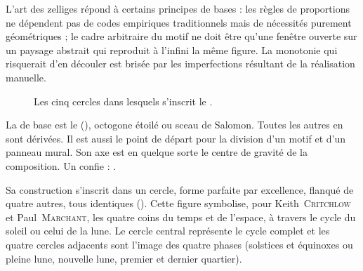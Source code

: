 L'art des zelliges répond à certains principes de bases : les règles 
de proportions ne dépendent pas de codes empiriques traditionnels mais 
de nécessités purement géométriques ; le cadre arbitraire du motif ne 
doit être qu'une fenêtre ouverte sur un paysage abstrait qui reproduit 
à l'infini la même figure. La monotonie qui risquerait d'en découler 
est brisée par les imperfections résultant de la réalisation manuelle.

\begin{figure}[htb]
  \caption{Les cinq cercles dans lesquels s'inscrit le \hatim 
           \autocite{Castera_1996}.{}}
  \label{fig:cercle}
\end{figure}

La \furma de base est le \hatim (), 
octogone étoilé ou sceau de Salomon. Toutes les autres 
\furmas en sont dérivées. Il est aussi le point de départ 
pour la division d'un motif et d'un panneau mural. Son axe est en 
quelque sorte le centre de gravité de la composition. Un \zlaygi 
confie :  
\autocite{Castera_1996}.

Sa construction s'inscrit dans un cercle, forme parfaite 
par excellence, flanqué de quatre autres, tous identiques 
(). Cette figure symbolise, pour 
Keith~\textsc{Critchlow} et Paul~\textsc{Marchant}, les quatre coins 
du temps et de l'espace, à travers le cycle du soleil ou celui 
de la lune. Le cercle central représente le cycle complet et les 
quatre cercles adjacents sont l'image des quatre phases (solstices 
et équinoxes ou pleine lune, nouvelle lune, premier et dernier 
quartier).

